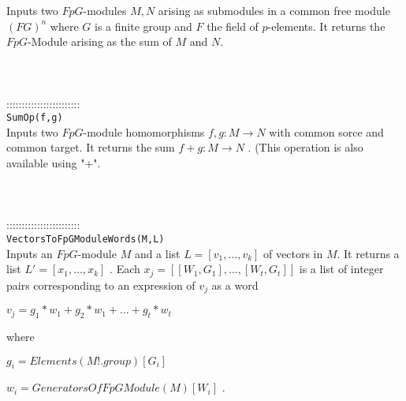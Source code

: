 \documentclass[a4paper,11pt]{report}
\begin{document}
{ Inputs two $FpG$-modules $M, N$ arising as submodules in a common free module $(FG)^n$ where $G$ is a finite group and $F$ the field of $p$-elements. It returns the $FpG$-Module arising as the sum of $M$ and $N$. \\
 \\
 \\
 \\
 ::::::::::::::::::::::::\\
 \texttt{SumOp(f,g) }\\
 

 Inputs two $FpG$-module homomorphisms $f,g:M \longrightarrow N$ with common sorce and common target. It returns the sum $f+g:M \longrightarrow N$ . (This operation is also available using "+". \\
 \\
 \\
 \\
 ::::::::::::::::::::::::\\
 \texttt{VectorsToFpGModuleWords(M,L) }\\
 

 Inputs an $FpG$-module $M$ and a list $L=[v_1,\ldots ,v_k]$ of vectors in $M$. It returns a list $L'= [x_1,...,x_k]$ . Each $x_j=[[W_1,G_1],...,[W_t,G_t]]$ is a list of integer pairs corresponding to an expression of $v_j$ as a word 

 $ v_j = g_1*w_1 + g_2*w_1 + ... + g_t*w_t $ 

 where 

 $g_i=Elements(M!.group)[G_i]$ 

 $w_i=GeneratorsOfFpGModule(M)[W_i]$ . \\
 \\
 \\
 }

 
\end{document}

